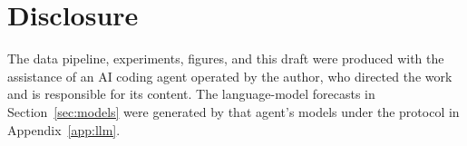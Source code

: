 \documentclass[format=acmsmall, review=false]{acmart}
\begin{document}
\section{Disclosure}

The data pipeline, experiments, figures, and this draft were produced with the assistance of an AI coding agent operated by the author, who directed the work and is responsible for its content. The language-model forecasts in Section~\ref{sec:models} were generated by that agent's models under the protocol in Appendix~\ref{app:llm}.
\end{document}
